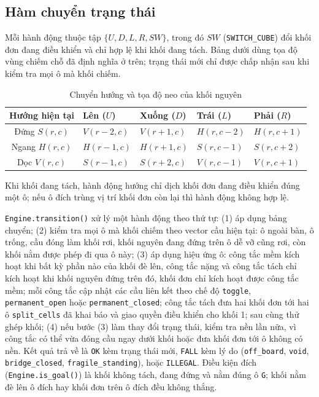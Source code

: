 \subsection{Hàm chuyển trạng thái}
Mỗi hành động thuộc tập $\{U,D,L,R,\mathit{SW}\}$, trong đó $\mathit{SW}$ (\texttt{SWITCH\_CUBE}) đổi khối đơn đang điều khiển và chỉ hợp lệ khi khối đang tách. Bảng dưới dùng tọa độ vùng chiếm chỗ đã định nghĩa ở trên; trạng thái mới chỉ được chấp nhận sau khi kiểm tra mọi ô mà khối chiếm.

\begin{table}[h!]
    \centering
    \caption{Chuyển hướng và tọa độ neo của khối nguyên}
    \label{tab:orientation_transitions}
    \begin{tabularx}{\textwidth}{c X X X X}
        \toprule
        \textbf{Hướng hiện tại} & \textbf{Lên ($U$)} & \textbf{Xuống ($D$)} & \textbf{Trái ($L$)} & \textbf{Phải ($R$)} \\
        \midrule
        Đứng $S(r,c)$ & $V(r-2,c)$ & $V(r+1,c)$ & $H(r,c-2)$ & $H(r,c+1)$ \\
        Ngang $H(r,c)$ & $H(r-1,c)$ & $H(r+1,c)$ & $S(r,c-1)$ & $S(r,c+2)$ \\
        Dọc $V(r,c)$ & $S(r-1,c)$ & $S(r+2,c)$ & $V(r,c-1)$ & $V(r,c+1)$ \\
        \bottomrule
    \end{tabularx}
\end{table}

Khi khối đang tách, hành động hướng chỉ dịch khối đơn đang điều khiển đúng một ô; nếu ô đích trùng vị trí khối đơn còn lại thì hành động không hợp lệ.

\texttt{Engine.transition()} xử lý một hành động theo thứ tự: (1) áp dụng bảng chuyển; (2) kiểm tra mọi ô mà khối chiếm theo vector cầu hiện tại: ô ngoài bàn, ô trống, cầu đóng làm khối rơi, khối nguyên đang đứng trên ô dễ vỡ cũng rơi, còn khối nằm được phép đi qua ô này; (3) áp dụng hiệu ứng ô: công tắc mềm kích hoạt khi bất kỳ phần nào của khối đè lên, công tắc nặng và công tắc tách chỉ kích hoạt khi khối nguyên đứng trên đó, khối đơn chỉ kích hoạt được công tắc mềm; mỗi công tắc cập nhật các cầu liên kết theo chế độ \texttt{toggle}, \texttt{permanent\_open} hoặc \texttt{permanent\_closed}; công tắc tách đưa hai khối đơn tới hai ô \texttt{split\_cells} đã khai báo và giao quyền điều khiển cho khối 1; sau cùng thử ghép khối; (4) nếu bước (3) làm thay đổi trạng thái, kiểm tra nền lần nữa, vì công tắc có thể vừa đóng cầu ngay dưới khối hoặc đưa khối đơn tới ô không có nền. Kết quả trả về là \texttt{OK} kèm trạng thái mới, \texttt{FALL} kèm lý do (\texttt{off\_board}, \texttt{void}, \texttt{bridge\_closed}, \texttt{fragile\_standing}), hoặc \texttt{ILLEGAL}. Điều kiện đích (\texttt{Engine.is\_goal()}) là khối không tách, đang đứng và nằm đúng ô \texttt{G}; khối nằm đè lên ô đích hay khối đơn trên ô đích đều không thắng.

